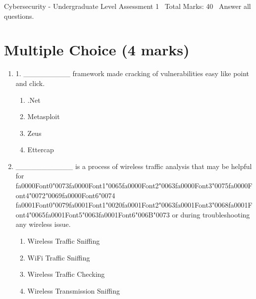 \documentclass[12pt]{article}
\begin{document}
\begin{center}
Cybersecurity - Undergraduate Level Assessment 1 \
Total Marks: 40 \
Answer all questions.
\end{center}

\section*{Multiple Choice (4 marks)}
\begin{enumerate}[label=\arabic*.]
\item 1. \_\_\_\_\_\_\_\_\_ framework made cracking of vulnerabilities easy like point and click.
\begin{enumerate}[label=(\alph*)]
    \item .Net
    \item Metasploit
    \item Zeus
    \item Ettercap
\end{enumerate}
\item \_\_\_\_\_\_\_\_\_\_\_ is a process of wireless traffic analysis that may be helpful for {\csname fa0000Font0\endcsname\char"0073}{\csname fa0000Font1\endcsname\char"0065}{\csname fa0000Font2\endcsname\char"0063}{\csname fa0000Font3\endcsname\char"0075}{\csname fa0000Font4\endcsname\char"0072}{\char"0069}{\csname fa0000Font6\endcsname\char"0074} {\csname fa0001Font0\endcsname\char"0079}{\csname fa0001Font1\endcsname\char"0020}{\csname fa0001Font2\endcsname\char"0063}{\csname fa0001Font3\endcsname\char"0068}{\csname fa0001Font4\endcsname\char"0065}{\csname fa0001Font5\endcsname\char"0063}{\csname fa0001Font6\endcsname\char"006B}{\char"0073} or during troubleshooting any wireless issue.
\begin{enumerate}[label=(\alph*)]
    \item Wireless Traffic Sniffing
    \item WiFi Traffic Sniffing
    \item Wireless Traffic Checking
    \item Wireless Transmission Sniffing
\end{enumerate}
\end{enumerate}
\end{document}
